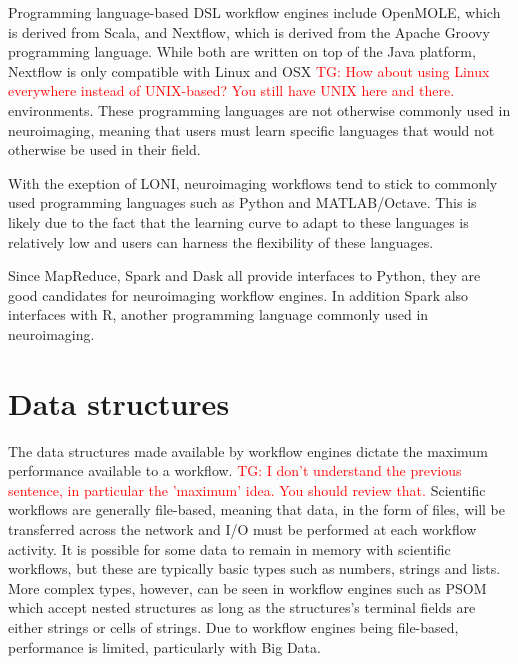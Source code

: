 \documentclass{report}
\newcommand{\tristan}[1]{\textcolor{red}{TG: #1}}
\begin{document}
            Programming language-based DSL workflow engines include OpenMOLE, which is  
            derived from Scala, and Nextflow, which is derived from the Apache 
            Groovy programming language. While both are written on top of the 
            Java platform, Nextflow is only compatible with Linux and OSX \tristan{How about using Linux everywhere instead of UNIX-based? You still have UNIX here and there.} 
            environments. These programming languages are not otherwise commonly
            used in neuroimaging, meaning that users must learn specific 
            languages that would not otherwise be used in their field.

            With the exeption of LONI, neuroimaging workflows tend to stick to
            commonly used programming languages such as Python and MATLAB/Octave.
            This is likely due to the fact that the learning curve to adapt to
            these languages is relatively low and users can harness the 
            flexibility of these languages. 
            
            Since MapReduce, Spark and Dask all provide interfaces to Python,  
            they are good candidates for neuroimaging workflow engines. In addition
            Spark also interfaces with R, another programming language commonly
            used in neuroimaging.

            \section{Data structures}\label{ds}
                
                The data structures made available by workflow engines dictate
                the maximum performance available to a workflow. \tristan{I don't understand the previous sentence, 
                in particular the 'maximum' idea. You should review that.} Scientific
                workflows are generally file-based, meaning that data, in the 
                form of files, will be 
                transferred across the network and I/O must be
                performed at each workflow activity. It is possible for some 
                data to remain in memory with scientific workflows, but these 
                are typically basic types such as numbers, strings and lists.
                More complex types, however, can be seen in workflow engines 
                such as PSOM which accept nested structures as long as the
                structures's terminal fields are either strings or cells of 
                strings. Due to workflow engines being file-based, performance
                is limited, particularly with Big Data.
                
\end{document}
